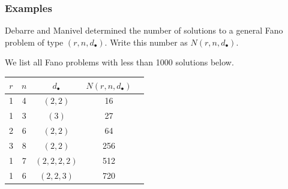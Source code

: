 \documentclass{beamer}
\theoremstyle{definition}
\begin{document}
%
\begin{frame}
\frametitle{Examples}
Debarre and Manivel determined the number of solutions to a general Fano problem of type $(r,n,d_\bullet)$. Write this number as $N(r,n,d_\bullet)$.

We list all Fano problems with less than 1000 solutions below.

\hspace{-.5cm}
\begin{minipage}{.99\textwidth}
\begin{table}[htb]
  \label{Small Fano}
  \def\arraystretch{1.1}
  \begin{tabular}{||c|c|c|c|c||}
    \hline
    $r$ & $n$ & $d_\bullet$ & $N(r,n,d_\bullet)$\\
    \hline\hline
    1 & 4 & $(2,2)$ & 16\\
    \hline
    1 & 3 & $(3)$ & 27\\
    \hline
    2 & 6 & $(2,2)$ & 64\\
    \hline
    3 & 8 & $(2,2)$ & 256\\
    \hline
    1 & 7 & $(2,2,2,2)$ & 512\\
    \hline
    1 & 6 & $(2,2,3)$ & 720\\
    \hline
  \end{tabular}
\end{table}
\end{minipage}


\end{frame}
\end{document}
